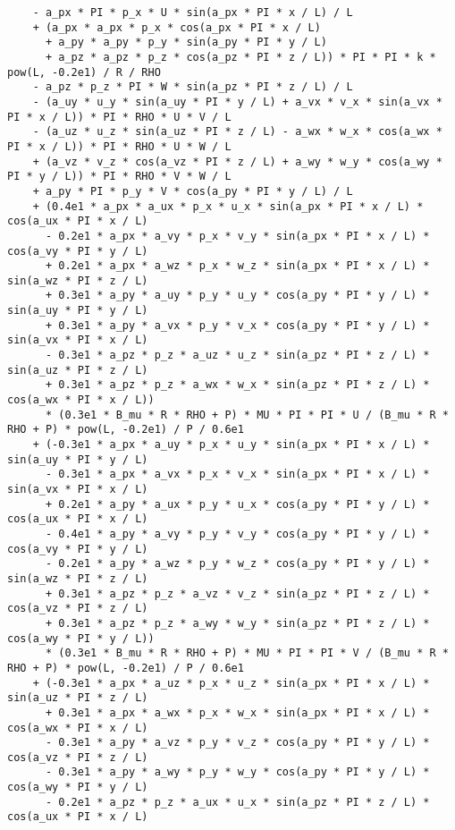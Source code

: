 \documentclass[10pt]{article}
\begin{document}
\begin{small}
\begin{verbatim}
    - a_px * PI * p_x * U * sin(a_px * PI * x / L) / L
    + (a_px * a_px * p_x * cos(a_px * PI * x / L)
      + a_py * a_py * p_y * sin(a_py * PI * y / L)
      + a_pz * a_pz * p_z * cos(a_pz * PI * z / L)) * PI * PI * k * pow(L, -0.2e1) / R / RHO
    - a_pz * p_z * PI * W * sin(a_pz * PI * z / L) / L
    - (a_uy * u_y * sin(a_uy * PI * y / L) + a_vx * v_x * sin(a_vx * PI * x / L)) * PI * RHO * U * V / L
    - (a_uz * u_z * sin(a_uz * PI * z / L) - a_wx * w_x * cos(a_wx * PI * x / L)) * PI * RHO * U * W / L
    + (a_vz * v_z * cos(a_vz * PI * z / L) + a_wy * w_y * cos(a_wy * PI * y / L)) * PI * RHO * V * W / L
    + a_py * PI * p_y * V * cos(a_py * PI * y / L) / L
    + (0.4e1 * a_px * a_ux * p_x * u_x * sin(a_px * PI * x / L) * cos(a_ux * PI * x / L)
      - 0.2e1 * a_px * a_vy * p_x * v_y * sin(a_px * PI * x / L) * cos(a_vy * PI * y / L)
      + 0.2e1 * a_px * a_wz * p_x * w_z * sin(a_px * PI * x / L) * sin(a_wz * PI * z / L)
      + 0.3e1 * a_py * a_uy * p_y * u_y * cos(a_py * PI * y / L) * sin(a_uy * PI * y / L)
      + 0.3e1 * a_py * a_vx * p_y * v_x * cos(a_py * PI * y / L) * sin(a_vx * PI * x / L)
      - 0.3e1 * a_pz * p_z * a_uz * u_z * sin(a_pz * PI * z / L) * sin(a_uz * PI * z / L)
      + 0.3e1 * a_pz * p_z * a_wx * w_x * sin(a_pz * PI * z / L) * cos(a_wx * PI * x / L))
      * (0.3e1 * B_mu * R * RHO + P) * MU * PI * PI * U / (B_mu * R * RHO + P) * pow(L, -0.2e1) / P / 0.6e1
    + (-0.3e1 * a_px * a_uy * p_x * u_y * sin(a_px * PI * x / L) * sin(a_uy * PI * y / L)
      - 0.3e1 * a_px * a_vx * p_x * v_x * sin(a_px * PI * x / L) * sin(a_vx * PI * x / L)
      + 0.2e1 * a_py * a_ux * p_y * u_x * cos(a_py * PI * y / L) * cos(a_ux * PI * x / L)
      - 0.4e1 * a_py * a_vy * p_y * v_y * cos(a_py * PI * y / L) * cos(a_vy * PI * y / L)
      - 0.2e1 * a_py * a_wz * p_y * w_z * cos(a_py * PI * y / L) * sin(a_wz * PI * z / L)
      + 0.3e1 * a_pz * p_z * a_vz * v_z * sin(a_pz * PI * z / L) * cos(a_vz * PI * z / L)
      + 0.3e1 * a_pz * p_z * a_wy * w_y * sin(a_pz * PI * z / L) * cos(a_wy * PI * y / L))
      * (0.3e1 * B_mu * R * RHO + P) * MU * PI * PI * V / (B_mu * R * RHO + P) * pow(L, -0.2e1) / P / 0.6e1
    + (-0.3e1 * a_px * a_uz * p_x * u_z * sin(a_px * PI * x / L) * sin(a_uz * PI * z / L)
      + 0.3e1 * a_px * a_wx * p_x * w_x * sin(a_px * PI * x / L) * cos(a_wx * PI * x / L)
      - 0.3e1 * a_py * a_vz * p_y * v_z * cos(a_py * PI * y / L) * cos(a_vz * PI * z / L)
      - 0.3e1 * a_py * a_wy * p_y * w_y * cos(a_py * PI * y / L) * cos(a_wy * PI * y / L)
      - 0.2e1 * a_pz * p_z * a_ux * u_x * sin(a_pz * PI * z / L) * cos(a_ux * PI * x / L)

\end{verbatim}
\end{small}
\end{document}
